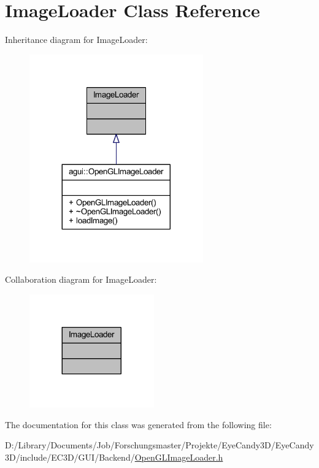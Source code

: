 \hypertarget{class_image_loader}{}\section{Image\+Loader Class Reference}
\label{class_image_loader}


Inheritance diagram for Image\+Loader\+:
\nopagebreak
\begin{figure}[H]
\begin{center}
\leavevmode
\includegraphics[width=212pt]{class_image_loader__inherit__graph}
\end{center}
\end{figure}


Collaboration diagram for Image\+Loader\+:
\nopagebreak
\begin{figure}[H]
\begin{center}
\leavevmode
\includegraphics[width=152pt]{class_image_loader__coll__graph}
\end{center}
\end{figure}


The documentation for this class was generated from the following file\+:\begin{DoxyCompactItemize}
\item 
D\+:/\+Library/\+Documents/\+Job/\+Forschungsmaster/\+Projekte/\+Eye\+Candy3\+D/\+Eye\+Candy3\+D/include/\+E\+C3\+D/\+G\+U\+I/\+Backend/\mbox{\hyperlink{_open_g_l_image_loader_8h}{Open\+G\+L\+Image\+Loader.\+h}}\end{DoxyCompactItemize}
